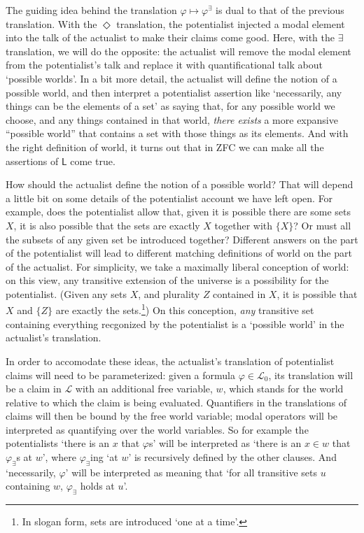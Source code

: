 \documentclass{article}
\begin{document}
The guiding idea behind the translation  $\varphi \mapsto \varphi^\exists$ is 
dual to that of the previous translation.
With the $\Diamond$ translation, the potentialist injected a modal element into 
the talk of the actualist to make their claims come good. Here, with the $\exists$ translation,
we will do the opposite: the actualist will remove the modal element from 
the potentialist's talk and replace it 
with quantificational talk about `possible worlds'.
In a bit more detail,
the actualist will define the notion of a possible world, 
and then interpret a potentialist assertion 
like `necessarily, any things can be the elements of a set' as saying that, 
for any possible world 
we choose, and any things contained in that world, 
\emph{there exists} a more expansive ``possible 
world'' that contains a set with those things as its elements. And with the right 
definition of world, it turns out that in ZFC we can make all the assertions of 
$\mathsf{L}$ come true. 

How should the actualist define the notion of a possible world? That will depend a 
little bit on some details of the potentialist account we have left open. For example, 
does the potentialist allow that, given it is possible there are some sets $X$, it is also 
possible that the sets are exactly $X$ together with $\{X\}$? Or must 
all the subsets of any given set be introduced together? Different answers on the 
part of the potentialist will lead to different matching definitions of world on 
the part of the actualist. For simplicity, we take a maximally liberal conception of 
world: on this view, any transitive extension of the universe is a possibility for the 
potentialist. (Given any sets $X$, and plurality $Z$ contained in $X$, it is possible 
that $X$ and $\{Z\}$ are exactly the sets.\footnote{
    In slogan form, sets are introduced `one at a time'.}) On this conception, \emph{any}
transitive set containing everything recgonized by the potentialist is a `possible world'
in the actualist's translation.

In order to accomodate these ideas, the actualist's translation of potentialist claims 
will need to be parameterized: given a formula $\varphi \in \mathcal{L}_0$, its 
translation will be a claim in $\mathcal{L}$ with an additional free variable, $w$, 
which stands for the world relative to which the claim is being evaluated. Quantifiers 
in the translations of claims will then be bound by the free world variable; 
modal operators will be interpreted as quantifying over the world variables. So for
example the potentialists `there is an $x$ that $\varphi$s' will be interpreted as 
`there is an $x \in w$ that $\varphi_\exists$s at $w$', where $\varphi_\exists$ing `at $w$' is recursively 
defined by the other clauses. And `necessarily, $\varphi$' will be interpreted as meaning 
that `for all transitive sets $u$ containing $w$, $\varphi_\exists$ holds at $u$'.
\end{document}
